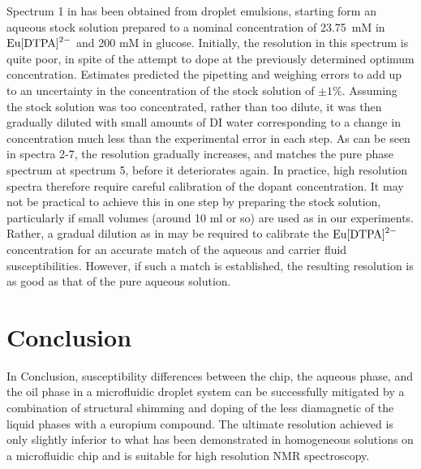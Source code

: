 Spectrum 1 in  has been obtained from
droplet emulsions, starting form an aqueous stock solution prepared to a nominal concentration
of 23.75~mM in $\ce{Eu[DTPA]^{2-}}$ and 200 mM in glucose.
Initially, the resolution in this spectrum is quite poor, in spite of
the attempt to dope at the previously determined optimum concentration. Estimates predicted
the pipetting and weighing errors to add up to an uncertainty in the concentration of the
stock solution of $\pm 1\%$.
Assuming the stock solution was too concentrated, rather than too dilute, it was
then gradually diluted with small amounts of DI water corresponding
to a change in concentration much less than the experimental error in each step.
As can be seen in spectra 2-7, the resolution gradually increases, and matches
the pure phase spectrum at spectrum 5, before it deteriorates again.
In practice, high resolution spectra therefore require careful calibration of the dopant
concentration. It may not be practical to achieve this in one step by preparing the stock
solution, particularly if small volumes (around 10 ml or so) are used as in our
experiments. Rather, a gradual dilution as in  may be required
to calibrate the $\ce{Eu[DTPA]^{2-}}$ concentration for an accurate match of
the aqueous and carrier fluid susceptibilities. However, if such a match is established,
the resulting resolution is as good as that of the pure aqueous solution.

\section{Conclusion}

In Conclusion, susceptibility differences between the chip,
the aqueous phase, and the oil phase in a microfluidic droplet system can
be successfully mitigated by a combination of structural shimming and
doping of the less diamagnetic of the liquid phases with a europium compound.
The ultimate resolution achieved is only slightly inferior to what has been
demonstrated in homogeneous solutions on a microfluidic chip and is suitable for high
resolution NMR spectroscopy.
